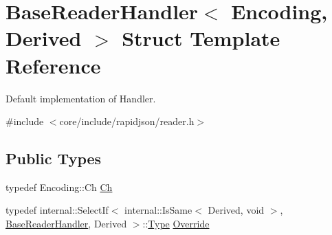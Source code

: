 \hypertarget{structBaseReaderHandler}{}\section{Base\+Reader\+Handler$<$ Encoding, Derived $>$ Struct Template Reference}
\label{structBaseReaderHandler}


Default implementation of Handler.  




{\ttfamily \#include $<$core/include/rapidjson/reader.\+h$>$}

\subsection*{Public Types}
\begin{DoxyCompactItemize}
\item 
typedef Encoding\+::\+Ch \hyperlink{structBaseReaderHandler_a8302c755dd3560c8c5bac99162c28214}{Ch}
\item 
typedef internal\+::\+Select\+If$<$ internal\+::\+Is\+Same$<$ Derived, void $>$, \hyperlink{structBaseReaderHandler}{Base\+Reader\+Handler}, Derived $>$\+::\hyperlink{rapidjson_8h_a1d1cfd8ffb84e947f82999c682b666a7}{Type} \hyperlink{structBaseReaderHandler_a7b6c70d9bf7483b2de5d249f1593776a}{Override}
\end{DoxyCompactItemize}
